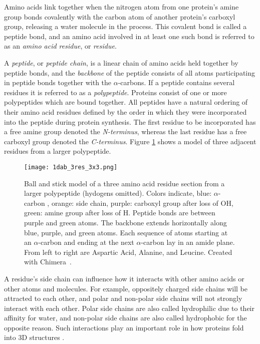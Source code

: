 Amino acids link together when the nitrogen atom from one protein's amine group bonds covalently with the carbon atom of another protein's carboxyl group, releasing a water molecule in the process.
This covalent bond is called a peptide bond, and an amino acid involved in at least one such bond is referred to as an \textit{amino acid residue}, or \textit{residue}.

A \textit{peptide}, or \textit{peptide chain}, is a linear chain of amino acids held together by peptide bonds, and the \textit{backbone} of the peptide consists of all atoms participating in peptide bonds together with the $\alpha$-carbons.
If a peptide contains several residues it is referred to as a \textit{polypeptide}.
Proteins consist of one or more polypeptides which are bound together.
All peptides have a natural ordering of their amino acid residues defined by the order in which they were incorporated into the peptide during protein synthesis.
The first residue to be incorporated has a free amine group denoted the \textit{N-terminus}, whereas the last residue has a free carboxyl group denoted the \textit{C-terminus}.
Figure \ref{fig:3res} shows a model of three adjacent residues from a larger polypeptide.

\begin{figure}
	\centering
	\texttt{[image: 1dab\_3res\_3x3.png]}
	\caption{Ball and stick model of a three amino acid residue section from a larger polypeptide (hydogens omitted). Colors indicate, blue: $\alpha$-carbon , orange: side chain, purple: carboxyl group after loss of OH, green: amine group after loss of H. Peptide bonds are between purple and green atoms. The backbone extends horizontally along blue, purple, and green atoms. Each sequence of atoms starting at an $\alpha$-carbon and ending at the next $\alpha$-carbon lay in an amide plane. From left to right are Aspartic Acid, Alanine, and Leucine. Created with Chimera~\cite{pettersen2004}.}
	\label{fig:3res}
\end{figure}

A residue's side chain can influence how it interacts with other amino acids or other atoms and molecules. For example, oppositely charged side chains will be attracted to each other, and polar and non-polar side chains will not strongly interact with each other. 
Polar side chains are also called hydrophilic due to their affinity for water, and non-polar side chains are also called hydrophobic for the opposite reason.
Such interactions play an important role in how proteins fold into 3D structures \cite{scheeffink2003}.

